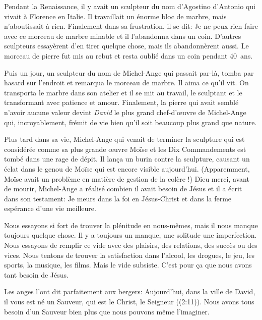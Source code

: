 

Pendant la Renaissance, il y avait un sculpteur du nom d'Agostino d'Antonio qui vivait à Florence en Italie. Il travaillait un énorme bloc de marbre, mais n'aboutissait à rien. Finalement dans sa frustration, il se dit: \og Je ne peux rien faire avec ce morceau de marbre minable \fg{} et il l'abandonna dans un coin. D'autres sculpteurs essayèrent d'en tirer quelque chose, mais ils abandonnèrent aussi. Le morceau de pierre fut mis au rebut et resta oublié dans un coin pendant 40~ans.

Puis un jour, un sculpteur du nom de Michel-Ange qui passait par-là, tomba par hasard sur l'endroit et remarqua le morceau de marbre. Il aima ce qu'il vit. On transporta le marbre dans son atelier et il se mit au travail, le sculptant et le transformant avec patience et amour. Finalement, la pierre qui avait semblé n'avoir aucune valeur devint \emph{David} le plus grand chef-d'œuvre de Michel-Ange qui, incroyablement, frémit de vie bien qu'il soit beaucoup plus grand que nature.

Plus tard dans sa vie, Michel-Ange qui venait de terminer la sculpture qui est considérée comme sa plus grande œuvre \ocadr Moïse et les Dix Commandements \fcadr{} est tombé dans une rage de dépit. Il lança un burin contre la sculpture, causant un éclat dans le genou de Moïse qui est encore visible aujourd'hui. (Apparemment, Moïse avait un problème en matière de \og gestion de la colère \fg{}!) Dieu merci, avant de mourir, Michel-Ange a réalisé combien il avait besoin de Jésus et il a écrit dans son testament: \og Je meurs dans la foi en Jésus-Christ et dans la ferme espérance d'une vie meilleure. \fg{}

Nous essayons si fort de trouver la plénitude en nous-mêmes, mais il nous manque toujours quelque chose. Il y a toujours un manque, une solitude une imperfection. Nous essayons de remplir ce vide avec des plaisirs, des relations, des succès ou des vices. Nous tentons de trouver la satisfaction dans l'alcool, les drogues, le jeu, les sports, la musique, les films. Mais le vide subsiste. C'est pour ça que nous avons tant besoin de Jésus.

Les anges l'ont dit parfaitement aux bergers:  \og Aujourd'hui, dans la ville de David, il vous est né un Sauveur, qui est le Christ, le Seigneur\fg{} ((2:11)). Nous avons tous besoin d'un Sauveur bien plus que nous pouvons même l'imaginer.


